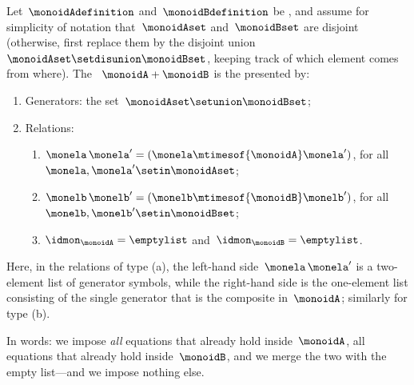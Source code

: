 \begin{ctdefinition}
    \label{def:sum-monoids}
    Let~$\monoidAdefinition$ and~$\monoidBdefinition$ be , and assume for simplicity of notation that~$\monoidAset$ and~$\monoidBset$ are disjoint (otherwise, first replace them by the disjoint union~$\monoidAset \setdisunion \monoidBset$, keeping track of which element comes from where).
    The ~$\monoidA + \monoidB$ is the  presented by:

    \constit

    \begin{enumerate}
        \item Generators: the set~$\monoidAset \setunion \monoidBset$;
        \item Relations:
              \begin{enumerate}
                  \item $\monela \, \monela' = (\monela \mtimesof{\monoidA} \monela')$, for all~$\monela, \monela' \setin \monoidAset$;
                  \item $\monelb \, \monelb' = (\monelb \mtimesof{\monoidB} \monelb')$, for all~$\monelb, \monelb' \setin \monoidBset$;
                  \item $\idmon_\monoidA = \emptylist$ and~$\idmon_\monoidB = \emptylist$.
              \end{enumerate}
    \end{enumerate}

    Here, in the relations of type (a), the left-hand side~$\monela \, \monela'$ is a two-element list of generator symbols, while the right-hand side is the one-element list consisting of the single generator that is the composite in~$\monoidA$; similarly for type (b).
\end{ctdefinition}

In words: we impose \emph{all} equations that already hold inside~$\monoidA$, all equations that already hold inside~$\monoidB$, and we merge the two  with the empty list---and we impose nothing else.

